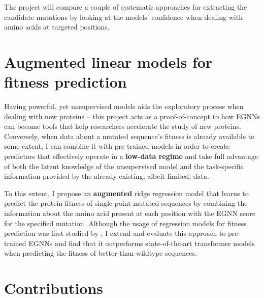 The project will compare a couple of systematic approaches for extracting the candidate mutations by looking at the models' confidence when dealing with amino acids at targeted positions. 

\section{Augmented linear models for fitness prediction}

Having powerful, yet unsupervised models aids the exploratory process when dealing with new proteins – this project acts as a proof-of-concept to how EGNNs can become tools that help researchers accelerate the study of new proteins. Conversely, when data about a mutated sequence's fitness is already available to some extent, I can combine it with pre-trained models in order to create predictors that effectively operate in a \textbf{low-data regime} and take full advantage of both the latent knowledge of the unsupervised model and the task-specific information provided by the already existing, albeit limited, data. 

To this extent, I propose an \textbf{augmented} ridge regression model that learns to predict the protein fitness of single-point mutated sequences by combining the information about the amino acid present at each position with the EGNN score for the specified mutation. Although the usage of regression models for fitness prediction was first studied by \citet{chloe-hsu}, I extend and evaluate this approach to pre-trained EGNNs and find that it outperforms state-of-the-art transformer models when predicting the fitness of better-than-wildtype sequences. 

\section{Contributions}

